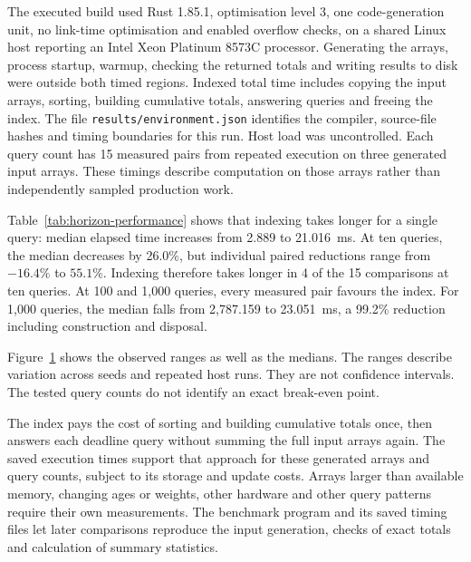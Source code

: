 The executed build used Rust 1.85.1, optimisation level 3, one code-generation unit, no link-time optimisation and enabled overflow checks, on a shared Linux host reporting an Intel Xeon Platinum 8573C processor. Generating the arrays, process startup, warmup, checking the returned totals and writing results to disk were outside both timed regions. Indexed total time includes copying the input arrays, sorting, building cumulative totals, answering queries and freeing the index. The file \texttt{results/environment.json} identifies the compiler, source-file hashes and timing boundaries for this run. Host load was uncontrolled. Each query count has 15 measured pairs from repeated execution on three generated input arrays. These timings describe computation on those arrays rather than independently sampled production work.

\begin{table}[tb]
\centering
\caption{Measured times for calculating totals of weighted scores and labour, in milliseconds. Each value is the median of 15 paired benchmark runs at query count $q$. Indexed total is timed separately and includes index disposal. Component medians need not sum to it. Reduction is $100(1-\text{indexed median}/\text{scan median})$, so a negative value means indexing takes longer.}
\label{tab:horizon-performance}
\small

\end{table}

Table~\ref{tab:horizon-performance} shows that indexing takes longer for a single query: median elapsed time increases from 2.889 to 21.016~ms. At ten queries, the median decreases by 26.0\%, but individual paired reductions range from $-16.4\%$ to $55.1\%$. Indexing therefore takes longer in 4 of the 15 comparisons at ten queries. At 100 and 1,000 queries, every measured pair favours the index. For 1,000 queries, the median falls from 2,787.159 to 23.051~ms, a 99.2\% reduction including construction and disposal.

Figure~\ref{fig:horizon-performance} shows the observed ranges as well as the medians. The ranges describe variation across seeds and repeated host runs. They are not confidence intervals. The tested query counts do not identify an exact break-even point.

\begin{figure}[tb]
\centering

\caption[Measured cohort-query times]{}
\label{fig:horizon-performance}
\end{figure}

The index pays the cost of sorting and building cumulative totals once, then answers each deadline query without summing the full input arrays again. The saved execution times support that approach for these generated arrays and query counts, subject to its storage and update costs. Arrays larger than available memory, changing ages or weights, other hardware and other query patterns require their own measurements. The benchmark program and its saved timing files let later comparisons reproduce the input generation, checks of exact totals and calculation of summary statistics.
